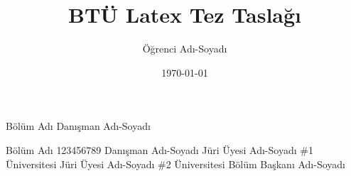 \documentclass{btu_mdbf_tez}
\title{BTÜ Latex Tez Taslağı}
\author{Öğrenci Adı-Soyadı}
\date{\today}
\begin{document}
	\startthesis

	\innercoverpage
		{Bölüm Adı}
		{Danışman Adı-Soyadı}

	\declaration
		{Bölüm Adı}
		{123456789}
		{Danışman Adı-Soyadı}
		{Jüri Üyesi Adı-Soyadı \#1}
		{Üniversitesi}
		{Jüri Üyesi Adı-Soyadı \#2}
		{Üniversitesi}
		{Bölüm Başkanı Adı-Soyadı}

	\startcontent
	
	
\end{document}
